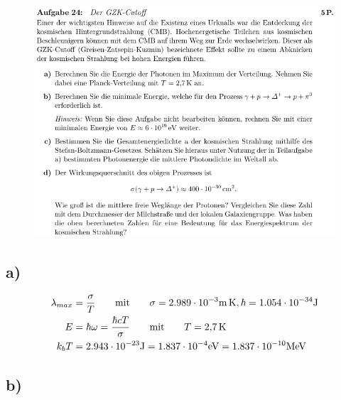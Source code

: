     \begin{figure}[H]
        \centering
        \includegraphics[width=\textwidth]{images/Aufgabe24.jpg}
        \label{fig:5}
    \end{figure}

\subsection{a)}

    \begin{align}
        \lambda_{max} &= \frac{\sigma}{T} \qquad \text{mit} \qquad \sigma = \text{$2.989\cdot 10^{-3}$\SI{}{\meter\kelvin}}, \hbar = \text{$1.054\cdot 10^{-34}$\SI{}{\joule}}\\
        E &= \hbar \omega = \frac{\hbar c T}{\sigma} \qquad \text{mit} \qquad T = \text{\SI{2.7}{\kelvin}}\\
        k_b T &= 2.943\cdot 10^{-23}\text{\SI{}{\joule}} = 1.837\cdot 10^{-4}\text{\SI{}{\electronvolt}} = 1.837\cdot 10^{-10}\text{\SI{}{\mega\electronvolt}}
    \end{align}

\subsection{b)}

